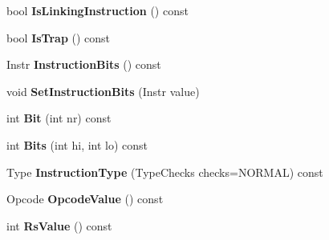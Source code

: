 \begin{DoxyCompactItemize}
\item 
bool {\bfseries Is\+Linking\+Instruction} () const \hypertarget{classv8_1_1internal_1_1_instruction_ac54b23c5457af32966a6812f8ab83530}{}\label{classv8_1_1internal_1_1_instruction_ac54b23c5457af32966a6812f8ab83530}

\item 
bool {\bfseries Is\+Trap} () const \hypertarget{classv8_1_1internal_1_1_instruction_a503e04780403e62f61719ff5137bfe74}{}\label{classv8_1_1internal_1_1_instruction_a503e04780403e62f61719ff5137bfe74}

\item 
Instr {\bfseries Instruction\+Bits} () const \hypertarget{classv8_1_1internal_1_1_instruction_afa0fa796cbf4e1d24cf72b5a910318b9}{}\label{classv8_1_1internal_1_1_instruction_afa0fa796cbf4e1d24cf72b5a910318b9}

\item 
void {\bfseries Set\+Instruction\+Bits} (Instr value)\hypertarget{classv8_1_1internal_1_1_instruction_a09df19b9577ff4a002c4f775b018d7a0}{}\label{classv8_1_1internal_1_1_instruction_a09df19b9577ff4a002c4f775b018d7a0}

\item 
int {\bfseries Bit} (int nr) const \hypertarget{classv8_1_1internal_1_1_instruction_ae6fd734924344b3ea773b8e8ffc63aa2}{}\label{classv8_1_1internal_1_1_instruction_ae6fd734924344b3ea773b8e8ffc63aa2}

\item 
int {\bfseries Bits} (int hi, int lo) const \hypertarget{classv8_1_1internal_1_1_instruction_a6924d0b3fa9f7007451ba4824ef9ce01}{}\label{classv8_1_1internal_1_1_instruction_a6924d0b3fa9f7007451ba4824ef9ce01}

\item 
Type {\bfseries Instruction\+Type} (Type\+Checks checks=N\+O\+R\+M\+AL) const \hypertarget{classv8_1_1internal_1_1_instruction_abaaadb5d95a3fee6e09eb3e931b44035}{}\label{classv8_1_1internal_1_1_instruction_abaaadb5d95a3fee6e09eb3e931b44035}

\item 
Opcode {\bfseries Opcode\+Value} () const \hypertarget{classv8_1_1internal_1_1_instruction_aac0bbcb30b456cbe3ffee0dcbe617824}{}\label{classv8_1_1internal_1_1_instruction_aac0bbcb30b456cbe3ffee0dcbe617824}

\item 
int {\bfseries Rs\+Value} () const \hypertarget{classv8_1_1internal_1_1_instruction_af70e23d79e84eab8749f9f55005f4932}{}\label{classv8_1_1internal_1_1_instruction_af70e23d79e84eab8749f9f55005f4932}


\end{DoxyCompactItemize}
